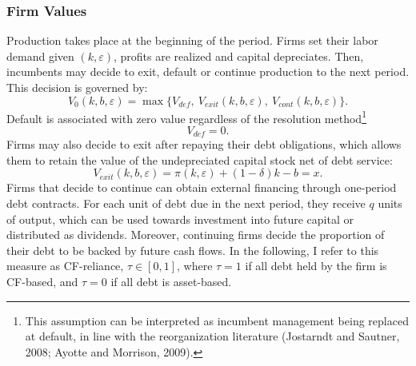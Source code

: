 \documentclass[12pt]{article}
\begin{document}
\subsubsection{Firm Values} \label{sec:Firm Values}
Production takes place at the beginning of the period. Firms set their labor demand given $(k,\varepsilon)$, profits are realized and capital depreciates. Then, incumbents may decide to exit, default or continue production to the next period. This decision is governed by: 
\begin{equation} \label{eq:default decision}
 V_0(k,b,\varepsilon) = \max \{V_{def}, \  V_{exit}(k,b,\varepsilon), \ V_{cont}(k,b,\varepsilon) \}.
\end{equation}
Default is associated with zero value regardless of the resolution method\footnote{This assumption can be interpreted as incumbent management being replaced at default, in line with the reorganization literature (Jostarndt and Sautner, 2008; Ayotte and Morrison, 2009).} 
\begin{equation}
 V_{def} = 0.
\end{equation}
Firms may also decide to exit after repaying their debt obligations, which allows them to retain the value of the undepreciated capital stock net of debt service: 
\begin{equation}
    V_{exit}(k, b, \varepsilon) = \pi(k,\varepsilon) + (1-\delta)k - b  = x.
\end{equation}
Firms that decide to continue can obtain external financing through one-period debt contracts. For each unit of debt due in the next period, they receive $q$ units of output, which can be used towards investment into future capital or distributed as dividends. Moreover, continuing firms decide the proportion of their debt to be backed by future cash flows. In the following, I refer to this measure as CF-reliance, $\tau \in [0,1]$, where $\tau = 1$ if all debt held by the firm is CF-based, and $\tau = 0$ if all debt is asset-based. 
\end{document}
